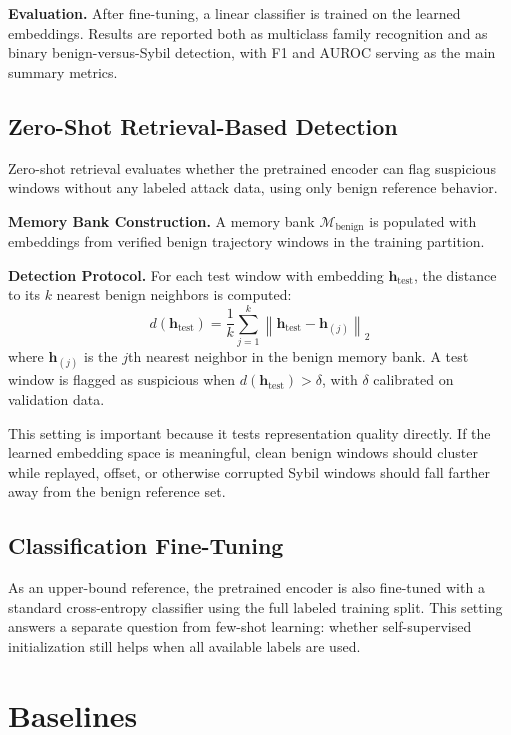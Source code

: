 \documentclass[12pt]{article}
\begin{document}
\textbf{Evaluation.} After fine-tuning, a linear classifier is trained on the learned embeddings. Results are reported both as multiclass family recognition and as binary benign-versus-Sybil detection, with F1 and AUROC serving as the main summary metrics.

\subsection{Zero-Shot Retrieval-Based Detection}

Zero-shot retrieval evaluates whether the pretrained encoder can flag suspicious windows without any labeled attack data, using only benign reference behavior.

\textbf{Memory Bank Construction.} A memory bank $\mathcal{M}_{\text{benign}}$ is populated with embeddings from verified benign trajectory windows in the training partition.

\textbf{Detection Protocol.} For each test window with embedding $\mathbf{h}_{\text{test}}$, the distance to its $k$ nearest benign neighbors is computed:
\begin{equation}
d(\mathbf{h}_{\text{test}}) = \frac{1}{k}\sum_{j=1}^{k} \left\| \mathbf{h}_{\text{test}} - \mathbf{h}_{(j)} \right\|_2
\end{equation}
where $\mathbf{h}_{(j)}$ is the $j$th nearest neighbor in the benign memory bank. A test window is flagged as suspicious when $d(\mathbf{h}_{\text{test}}) > \delta$, with $\delta$ calibrated on validation data.

This setting is important because it tests representation quality directly. If the learned embedding space is meaningful, clean benign windows should cluster while replayed, offset, or otherwise corrupted Sybil windows should fall farther away from the benign reference set.

\subsection{Classification Fine-Tuning}

As an upper-bound reference, the pretrained encoder is also fine-tuned with a standard cross-entropy classifier using the full labeled training split. This setting answers a separate question from few-shot learning: whether self-supervised initialization still helps when all available labels are used.

\section{Baselines}
\end{document}
